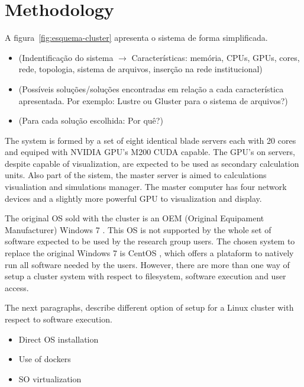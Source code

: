 \documentclass{anstrans}
\begin{document}
\section{Methodology}

  A figura~\ref{fig:esquema-cluster} apresenta o sistema de forma simplificada.
  
\begin{itemize}

\item (Indentificação do sistema $\rightarrow$ Características: memória, CPUs, GPUs, cores, rede, topologia, sistema de arquivos, inserção na rede institucional)

\item (Possíveis soluções/soluções encontradas em relação a cada característica apresentada. Por exemplo: Lustre \cite{Lustre} ou Gluster\cite{Gluster} para o sistema de arquivos?)

\item (Para cada solução escolhida: Por quê?)
  
\end{itemize}

The system is formed by a set of eight identical blade servers each with 20 cores and equiped with
NVIDIA GPU's M200 CUDA\cite{CUDA} capable. The GPU's on servers, despite capable of visualization,
are expected to be used as secondary calculation units. Also part of the sistem, the master server is aimed to calculations
visualiation and simulations manager. The master computer has
four network devices and a slightly more powerful GPU to visualization and display.

The original OS sold with the cluster is an OEM (Original Equipament Manufacturer) Windows 7 \cite{windows7}. This
OS is not supported by the whole set of software expected to be used by the research group users. The chosen
system to replace the original Windows 7 is CentOS \cite{centos}, which offers a plataform to natively run all
software needed by the users. However, there are more than one way of setup a cluster system with respect
to filesystem, software execution and user access.

The next paragraphs, describe different option of setup for a Linux cluster with respect to software execution.

\begin{itemize}
\item Direct OS installation
\item Use of dockers
\item SO virtualization
\end{itemize}
\end{document}
